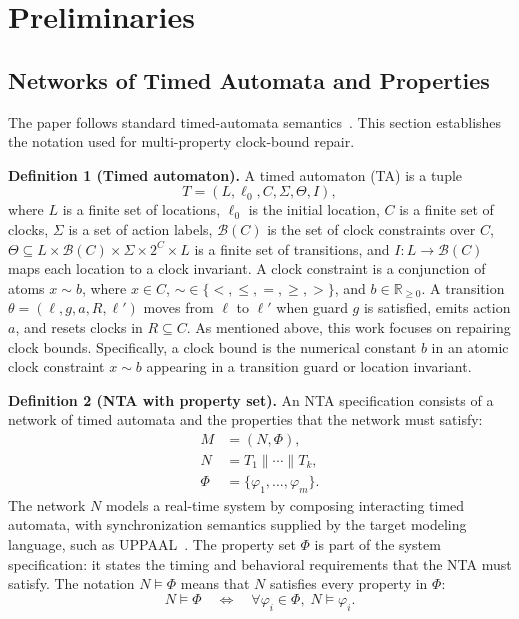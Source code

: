 ﻿\section{Preliminaries}
\label{sec:background}

\subsection{Networks of Timed Automata and Properties}

The paper follows standard timed-automata semantics~\cite{bengtsson2004timed}.
This section establishes the notation used for multi-property clock-bound repair.

\noindent\textbf{Definition 1 (Timed automaton).}
A timed automaton (TA) is a tuple
\begin{equation}
T=(L,\ell_0,C,\Sigma,\Theta,I),
\label{eq:ta}
\end{equation}
where $L$ is a finite set of locations, $\ell_0$ is the initial
location, $C$ is a finite set of clocks, $\Sigma$ is a set of action
labels, $\mathcal{B}(C)$ is the set of clock constraints over $C$,
$\Theta\subseteq L\times\mathcal{B}(C)\times\Sigma\times 2^C\times L$
is a finite set of transitions, and
$I:L\rightarrow\mathcal{B}(C)$ maps each location to a clock invariant.
A clock constraint is a conjunction of
atoms $x\sim b$, where $x\in C$, $\sim\in\{<,\leq,=,\geq,>\}$, and
$b\in\mathbb{R}_{\geq 0}$. A transition
$\theta=(\ell,g,a,R,\ell')$ moves from $\ell$ to $\ell'$ when guard
$g$ is satisfied, emits action $a$, and resets clocks in $R\subseteq C$.
As mentioned above, this work focuses on
repairing clock bounds. Specifically, a clock bound is the numerical
constant $b$ in an atomic clock constraint $x\sim b$ appearing in a
transition guard or location invariant.

\noindent\textbf{Definition 2 (NTA with property set).}
An NTA specification consists of a network of timed automata and the
properties that the network must satisfy:
\begin{equation}
\begin{aligned}
M &= (N,\Phi),\\
N &= T_1\parallel\cdots\parallel T_k,\\
\Phi &= \{\varphi_1,\ldots,\varphi_m\}.
\end{aligned}
\label{eq:nta-property-set}
\end{equation}
The network $N$ models a real-time system by composing
interacting timed automata, with synchronization semantics supplied by
the target modeling language, such as UPPAAL~\cite{larsen1997uppaal}.
The property set $\Phi$ is part of the system specification: it states
the timing and behavioral requirements that the NTA must satisfy. The
notation $N\models\Phi$ means that $N$ satisfies every property in
$\Phi$:
\begin{equation}
N\models\Phi
\quad\Longleftrightarrow\quad
\forall\varphi_i\in\Phi,\; N\models\varphi_i.
\label{eq:property-set-satisfaction}
\end{equation}

